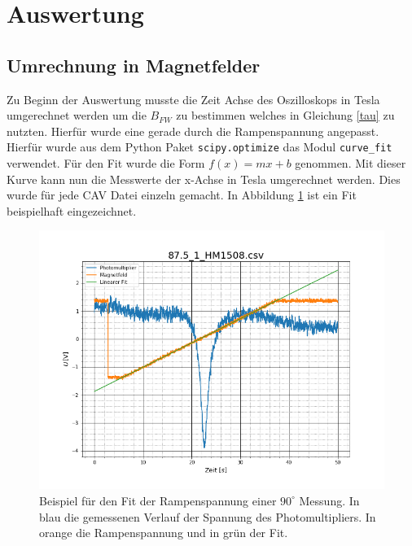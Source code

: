 \section{Auswertung}
\subsection{Umrechnung in Magnetfelder}
Zu Beginn der Auswertung musste die Zeit Achse des Oszilloskops in Tesla umgerechnet werden um die $B_{FW}$ zu bestimmen welches in Gleichung \ref{tau} zu nutzten. Hierfür wurde eine gerade durch die Rampenspannung angepasst. Hierfür wurde aus dem Python Paket \verb|scipy.optimize|\cite{SciPy_Opti} das Modul \verb|curve_fit| verwendet. Für den Fit wurde die Form $f(x)=mx+b$ genommen. Mit dieser Kurve kann nun die Messwerte der x-Achse in Tesla umgerechnet werden. Dies wurde für jede CAV Datei einzeln gemacht. In Abbildung \ref{MagnetfeldAbbildung} ist ein Fit beispielhaft eingezeichnet.\par
\begin{figure}[ht]
	\includegraphics[scale=0.5]{Bild/Magnetfeldcali.png}
	\centering
	\caption[Magnetfeld Kalibration]{Beispiel für den Fit der Rampenspannung einer $90^\circ$ Messung. In blau die gemessenen Verlauf der Spannung des Photomultipliers. In orange die Rampenspannung und in grün der Fit.}
	\label{MagnetfeldAbbildung}
\end{figure}
